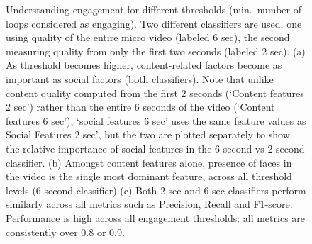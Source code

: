 \begin{figure}[htp]
\centering


\caption{ Understanding engagement for different thresholds (min.\ number of loops considered as engaging). Two different classifiers are used, one using quality of the entire micro video (labeled 6 sec), the second measuring quality from only the first two seconds (labeled 2 sec). (a) As threshold becomes higher, content-related factors become as important as social factors (both classifiers). Note that unlike content quality computed from the first 2 seconds (`Content features 2 sec') rather than the entire 6 seconds of the video (`Content features 6 sec'), `social features 6 sec' uses the same feature values as Social Features 2 sec', but the two are plotted separately to show the relative  importance of social features in the 6 second vs 2 second classifier. (b) Amongst content features alone, presence of faces in the video is the single most dominant feature, across all threshold levels (6 second classifier) (c) Both 2 sec and 6 sec classifiers perform similarly across all metrics such as Precision, Recall and F1-score. Performance is high across all engagement thresholds: all metrics are consistently over 0.8 or 0.9.}
\label{fig:classifier}
\end{figure}




